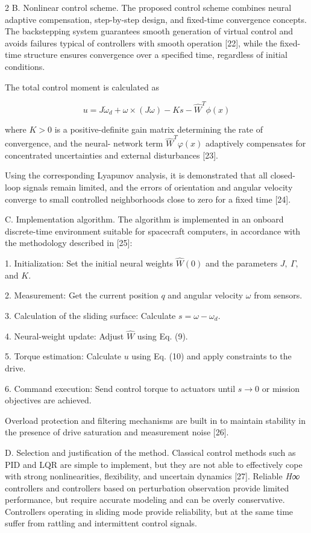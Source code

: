 \begin{multicols}{2}
B. Nonlinear control scheme. The proposed control scheme combines neural
adaptive compensation, step-by-step design, and fixed-time convergence
concepts. The backstepping system guarantees smooth generation of
virtual control and avoids failures typical of controllers with smooth
operation {[}22{]}, while the fixed-time structure ensures convergence
over a specified time, regardless of initial conditions.

The total control moment is calculated as

\begin{equation}
u = J{\dot{\omega}}_{d} + \omega \times (J\omega) - Ks - {\widehat{W}}^{T}\phi(x)
\end{equation}

where \(K > 0\) is a positive-definite gain matrix determining the rate
of convergence, and the neural- network term
\({\widehat{W}}^{Τ}\varphi(x)\) adaptively compensates for concentrated
uncertainties and external disturbances {[}23{]}.

Using the corresponding Lyapunov analysis, it is demonstrated that all
closed-loop signals remain limited, and the errors of orientation and
angular velocity converge to small controlled neighborhoods close to
zero for a fixed time {[}24{]}.

C. Implementation algorithm. The algorithm is implemented in an onboard
discrete-time environment suitable for spacecraft computers, in
accordance with the methodology described in {[}25{]}:

1. Initialization: Set the initial neural weights \(\widehat{W}(0)\) and
the parameters \(J,\ \Gamma,\) and \(K\).

2. Measurement: Get the current position \(q\) and angular velocity
\(\omega\) from sensors.

3. Calculation of the sliding surface: Calculate
\(s = \omega - \omega_{d}\).

4. Neural-weight update: Adjust \(\widehat{W}\) using Eq. (9).

5. Torque estimation: Calculate \(u\) using Eq. (10) and apply
constraints to the drive.

6. Command execution: Send control torque to actuators until
\(s \rightarrow 0\) or mission objectives are achieved.

Overload protection and filtering mechanisms are built in to maintain
stability in the presence of drive saturation and measurement noise
{[}26{]}.

D. Selection and justification of the method. Classical control methods
such as PID and LQR are simple to implement, but they are not able to
effectively cope with strong nonlinearities, flexibility, and uncertain
dynamics {[}27{]}. Reliable \emph{H∞} controllers and controllers based
on perturbation observation provide limited performance, but require
accurate modeling and can be overly conservative. Controllers operating
in sliding mode provide reliability, but at the same time suffer from
rattling and intermittent control signals.


\end{multicols}

